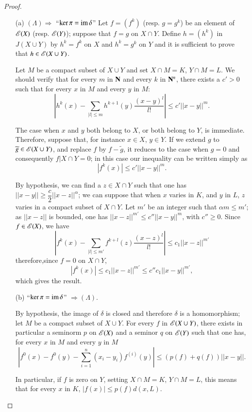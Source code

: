 \begin{proof}
\begin{itemize}
\item[(a)] $(\Lambda)\Rightarrow$ ``$\ker \pi=\operatorname{im} \delta$'' Let $f=(f^{k})$ (resp. $g=g^{k}$) be an element of $\mathscr{E}(X)$ (resp. $\mathscr{E}(Y)$); suppose that $f=g$ on $X\cap Y$. Define $h=(h^{k})$ in $J(X\cup Y)$ by $h^{k}=f^{k}$ on $X$ and $h^{k}=g^{k}$ on $Y$ and it is sufficient to prove that $h\in \mathscr{E}(X\cup Y)$.

Let $M$ be a compact subset of $X\cup Y$ and set $X\cap M=K$, $Y\cap M=L$. We should verify that for every $m$ in $\mathbf{N}$ and every $k$ in $\mathbf{N}^{n}$, there exists a $c'>0$ such that for every $x$ in $M$ and every $y$ in $M$:
$$
\left|h^{k}(x)-\sum\limits_{|l|\leq m}h^{k+1}(y)\dfrac{(x-y)^{l}}{l!}\right|\leq c'||x-y||^{m}.
$$

The case when $x$ and $y$ both belong to $X$, or both belong to $Y$, is immediate. Therefore, suppose that, for instance $x\in X$, $y\in Y$. If we extend $g$ to $\widetilde{g}\in \mathscr{E}(X\cup Y)$, and replace $f$ by $f-\widetilde{g}$, it reduces to the case when $g=0$ and consequently $f|X\cap Y=0$; in this case our inequality can be written simply as
$$
|f^{k}(x)|\leq c'||x-y||^{m}.
$$

By hypothesis, we can find a $z\in X\cap Y$ such that one has $||x-y||\geq \dfrac{c}{2}||x-z||^{\alpha}$; we can suppose that when $x$ varies in $K$, and $y$ in $L$, $z$ varies in a compact subset of $X\cap Y$. Let $m'$ be an integer such that $\alpha m\leq m'$; as $||x-z||$ is bounded, one has $||x-z||^{m'}\leq c''||x-y||^{m}$, with $c''\geq 0$. Since $f\in \mathscr{E}(X)$, we have
$$
\left|f^{k}(x)-\sum\limits_{|l|\leq m'}f^{k+l}(z)\dfrac{(x-z)^{l}}{l!}\right|\leq c_{1}||x-z||^{m'}
$$
therefore,\pageoriginale since $f=0$ on $X\cap Y$,
$$
|f^{k}(x)|\leq c_{1}||x-z||^{m'}\leq c''c_{1}||x-y||^{m'},
$$
which gives the result.

\item[(b)] ``$\ker \pi =\operatorname{im} \delta$'' $\Rightarrow (\Lambda)$.

By hypothesis, the image of $\delta$ is closed and therefore $\delta$ is a homomorphism; let $M$ be a compact subset of $X\cup Y$. For every $f$ in $\mathscr{E}(X\cup Y)$, there exists in particular a seminorm $p$ on $\mathscr{E}(X)$ and a seminor $q$ on $\mathscr{E}(Y)$ such that one has, for every $x$ in $M$ and every $y$ in $M$
$$
\left| f^{0}(x)-f^{0}(y)-\sum\limits^{n}_{i=1}(x_{i}-y_{i})f^{(i)}(y)\right|\leq (p(f)+q(f))||x-y||.
$$

In particular, if $f$ is zero on $Y$, setting $X\cap M=K$, $Y\cap M=L$, this means that for every $x$ in $K$, $|f(x)|\leq p(f)d(x,L)$.


\end{itemize}
\end{proof}
